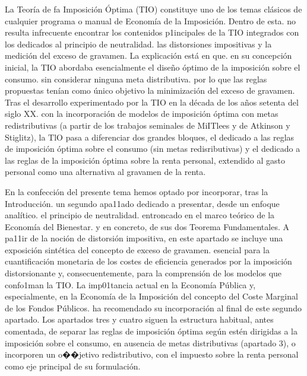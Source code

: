 \documentclass[10pt,a4paper]{article}
\begin{document}
 
La Teoría de fa Imposición Óptima (TIO) constituye uno de los temas clásicos de cualquier programa o manual de Economía de la Imposición. Dentro de esta. no resulta infrecuente encontrar los contenidos p1incipales de la TIO integrados con los dedicados al principio de neutralidad. las distorsiones impositivas y la medición del exceso de gravamen. La explicación está en que. en su concepción inicial, la TIO abordaba esencialmente el diseño óptimo de la imposición sobre el consumo. sin considerar ninguna meta distributiva. por lo que las reglas propuestas tenían como único objetivo la minimización del exceso de gravamen. Tras el desarrollo experimentado por la TIO en la década de los años setenta del siglo XX. con la incorporación de modelos de imposición óptima con metas redistributivas (a partir de los trabajos seminales de MiITlees y de Atkinson y Stiglitz), la TlO pasa a diferenciar dos grandes bloques, el dedicado a las reglas de imposición óptima sobre el consumo (sin metas redisributivas) y el dedicado a las reglas de la imposición óptima sobre la renta personal, extendido al gasto personal como una alternativa al gravamen de la renta.

En la confección del presente tema hemos optado por incorporar, tras la Introducción. un segundo apa11ado dedicado a presentar, desde un enfoque analítico. el principio de neutralidad. entroncado en el marco teórico de la Economía del Bienestar. y en concreto, de sus dos Teorema Fundamentales. A pa11ir de la noción de distorsión impositiva, en este apartado se incluye una exposición sintética del concepto de exceso de gravamen. esencial para la cuantificación monetaria de los costes de eficiencia generados por la imposición distorsionante y, consecuentemente, para la comprensión de los modelos que confo1man la TIO. La imp01tancia actual en la Economía Pública y, especialmente, en la Economía de la Imposición del concepto del Coste Marginal de los Fondos Públicos. ha recomendado su incorporación al final de este segundo apartado. Los apartados tres y cuatro siguen la estructura habitual, antes comentada, de separar las reglas de imposición óptima según estén dirigidas a la imposición sobre el consumo, en ausencia de metas distributivas (apartado 3), o incorporen un o��jetivo redistributivo, con el impuesto sobre la renta personal como eje principal de su formulación.
\end{document}
